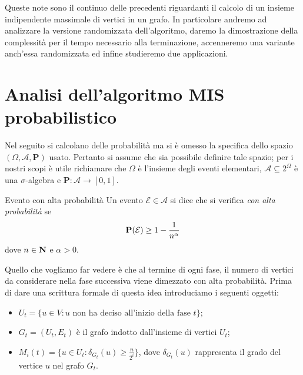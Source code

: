 \documentclass{article}
\begin{document}
\maketitle

Queste note sono il continuo delle precedenti riguardanti il calcolo di
un insieme indipendente massimale di vertici in un grafo. In particolare
andremo ad analizzare la versione randomizzata dell'algoritmo, daremo la 
dimostrazione della complessit\`a per il tempo necessario alla terminazione, 
accenneremo una variante anch'essa randomizzata ed infine studieremo due applicazioni.

\section{Analisi dell'algoritmo MIS probabilistico}
Nel seguito si calcolano delle probabilit\`a ma si \`e omesso la
specifica dello spazio $(\Omega, \mathcal{A}, \mathbf{P})$ 
usato. Pertanto si assume che sia possibile definire tale spazio; per i
nostri scopi \`e utile richiamare che $\Omega$ \`e l'insieme degli 
eventi elementari, $\mathcal{A}\subseteq 2^{\Omega}$ 
\`e una $\sigma$-algebra e $\mathbf{P}: \mathcal{A} \rightarrow [0,1]$.

\begin{defn}{Evento con alta probabilit\`a}
Un evento $\mathcal{E} \in \mathcal{A}$ si dice che si verifica \emph{
con alta probabilit\`a} se 
\begin{displaymath}
    \mathbf{P}(\mathcal{E}) \geq 1 - {{1} \over {n^\alpha}} 
\end{displaymath}
dove $n \in \mbox{{\bfseries N}}$ e $\alpha > 0$.
\end{defn}


Quello che vogliamo far vedere \`e che al termine di ogni fase, il 
numero di vertici da considerare nella fase successiva viene 
dimezzato con alta probabilit\`a. Prima di dare una scrittura formale di 
questa idea introduciamo i seguenti oggetti:
\begin{itemize}
    \item $U_t = \lbrace u \in V : u \text{ non ha deciso all'inizio della
        fase } t \rbrace$;
    \item $G_t = (U_t, E_t)$ \`e il grafo indotto dall'insieme di vertici $U_t$;
    \item $M_i(t) = \lbrace u \in U_t : \delta_{G_t}(u) \geq 
        \frac{n}{2^i} \rbrace$, dove $\delta_{G_t}(u)$ rappresenta il grado
        del vertice $u$ nel grafo $G_t$.
\end{itemize}
\end{document}
